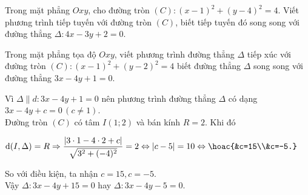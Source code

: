 \begin{bt}%
	Trong mặt phẳng $Oxy$, cho đường tròn $(C)\colon (x-1)^2+(y-4)^2=4$. Viết phương trình tiếp tuyến với đường tròn $(C)$, biết tiếp tuyến đó song song với đường thẳng $\Delta\colon 4x-3y+2=0$.
\end{bt}

\begin{bt}%
	Trong mặt phẳng tọa độ $Oxy$, viết phương trình đường thẳng $\Delta$ tiếp xúc với đường tròn $(C)\colon (x-1)^2+(y-2)^2=4$ biết đường thẳng $\Delta$ song song với đường thẳng $3x-4y+1=0$.
	\loigiai
	{
		Vì $\Delta\parallel d\colon 3x-4y+1=0$ nên phương trình đường thẳng $\Delta$ có dạng $3x-4y+c=0\,(c\neq 1)$.\\
		Đường tròn $(C)$ có tâm $I(1;2)$ và bán kính $R=2$. Khi đó
			\begin{center}
				$\mathrm{d}(I,\Delta)=R\Rightarrow \dfrac{|3\cdot1-4\cdot 2+c|}{\sqrt{3^2+(-4)^2}}=2 \Leftrightarrow |c-5|=10 \Leftrightarrow \hoac{&c=15\\&c=-5.}$
			\end{center}
		So với điều kiện, ta nhận $c=15,c=-5$.\\
		Vậy $\Delta\colon 3x-4y+15=0$ hay $\Delta\colon 3x-4y-5=0$.
	}
\end{bt}

